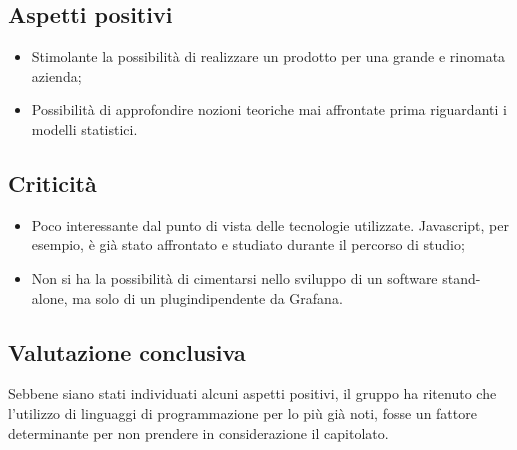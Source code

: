 \subsection{Aspetti positivi}
\begin{itemize}
	\item Stimolante la possibilità di realizzare un prodotto per una grande e rinomata azienda;
	\item Possibilità di approfondire nozioni teoriche mai affrontate prima riguardanti i modelli statistici.
\end{itemize}

\subsection{Criticità}
\begin{itemize}
	\item Poco interessante dal punto di vista delle tecnologie utilizzate. Javascript, per esempio, è già stato affrontato e studiato durante il percorso di studio;
	\item Non si ha la possibilità di cimentarsi nello sviluppo di un software stand-alone\glos, ma solo di un plugin\glo dipendente da Grafana. 
\end{itemize}

\subsection{Valutazione conclusiva}
Sebbene siano stati individuati alcuni aspetti positivi, il gruppo ha ritenuto che l'utilizzo di linguaggi di programmazione per lo più già noti, fosse un fattore determinante per non prendere in considerazione il capitolato\glos.